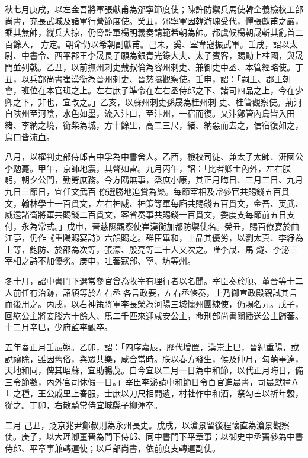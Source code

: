 \begin{pinyinscope}
 秋七月庚戌，以左金吾將軍張獻甫為邠寧節度使；陳許防禦兵馬使韓全義檢校工部尚書，充長武城及諸軍行營節度使。癸丑，邠寧軍因韓游瑰受代，憚張獻甫之嚴，乘其無帥，縱兵大掠，仍脅監軍楊明義奏請範希朝為帥。都虞候楊朝晟斬其亂首二百餘人，
 方定。朝命仍以希朝副獻甫。己未，奚、室韋寇振武軍。壬戌，詔以太尉、中書令、西平郡王李晟長子願為銀青光錄大夫、太子賓客，賜勛上柱國，與晟門並列戟。乙丑，以前撫州刺史戴叔倫為容州刺史、兼御史中丞、本管經略使。丁丑，以兵部尚書崔漢衡為晉州刺史、晉慈隰觀察使。壬申，詔：「嗣王、郡王朝會，班位在本官班之上。左右庶子準令在左右丞侍郎之下、諸司四品之上，今在少卿之下，非也，宜改之。」乙亥，以蘇州刺史孫晟為桂州刺
 史、桂管觀察使。荊河自陜州至河陰，水色如墨，流入汴口，至汴州，一宿而復。又汴鄭管內烏皆入田緒、李納之境，銜柴為城，方十餘里，高二三尺，緒、納惡而去之，信宿復如之，烏口皆流血。



 八月，以權判吏部侍郎吉中孚為中書舍人。乙酉，檢校司徒、兼太子太師、汧國公李勉薨。甲午，京師地震，其聲如雷。九月丙午，詔：「比者卿士內外，左右朕躬，朝夕公門，勤勞庶務。今方隅無事，烝庶小康，其正月晦日、三月三日、九月九日三節日，宜任文武百
 僚選勝地追賞為樂。每節宰相及常參官共賜錢五百貫文，翰林學士一百貫文，左右神威、神策等軍每廂共賜錢五百貫文，金吾、英武、威遠諸衛將軍共賜錢二百貫文，客省奏事共賜錢一百貫文，委度支每節前五日支付，永為常式。」戊申，晉慈隰觀察使崔漢衡加都防禦使名。癸丑，賜百僚宴於曲江亭，仍作《重陽賜宴詩》六韻賜之。群臣畢和，上品其優劣，以劉太真、李紓為上等，鮑防、於邵為次等，張濛、殷亮等二十人又次之。唯李晟、馬
 燧、李泌三宰相之詩不加優劣。庚申，吐蕃寇邠、寧、坊等州。



 冬十月，詔中書門下選常參官曾為牧宰有理行者以名聞。宰臣奏於頎、董晉等十二人前任有治跡，詔頎等於左右丞各言政要，左右丞條奏，上乃御宣政殿親試其言而後用之。丙戌，以右神策將軍李長榮為河陽三城懷州團練使，仍賜名元。戊子，回紇公主將妾媵六十餘人、馬二千匹來迎咸安公主，命刑部尚書關播送公主歸蕃。十二月辛巳，少府監李觀卒。



 五年春正月壬辰朔。乙卯，詔：「四序嘉辰，歷代增置，漢崇上巳，晉紀重陽，或說禳除，雖因舊俗，與眾共樂，咸合當時。朕以春方發生，候及仲月，勾萌畢達，天地和同，俾其昭蘇，宜助暢茂。自今宜以二月一日為中和節，以代正月晦日，備三令節數，內外官司休假一日。」宰臣李泌請中和節日令百官進農書，司農獻穜ＡＬ之種，王公戚里上春服，士庶以刀尺相問遺，村社作中和酒，祭勾芒以祈年穀，從之。丁卯，右散騎常侍宜城縣子柳渾卒。



 二月
 己丑，貶京兆尹鄭叔則為永州長史。戊戌，以滄景留後程懷直為滄景觀察使。庚子，以大理卿董晉為門下侍郎、同中書門下平章事；以御史中丞竇參為中書侍郎、平章事兼轉運使；以戶部尚書，依前度支轉運副使。




\end{pinyinscope}
